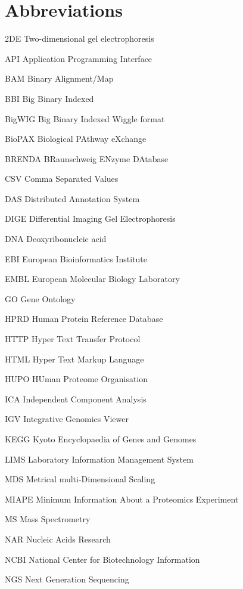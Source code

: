 \chapter*{Abbreviations}
\begin{abbreviations}
\setlength\itemsep{-0.5em}
	\item[2DE] Two-dimensional gel electrophoresis
	\item[API] Application Programming Interface
	\item[BAM] Binary Alignment/Map 
	\item[BBI] Big Binary Indexed
	\item[BigWIG] Big Binary Indexed Wiggle format
	\item[BioPAX] Biological PAthway eXchange
	\item[BRENDA] BRaunschweig ENzyme DAtabase
	\item[CSV]  Comma Separated Values 
	\item[DAS] Distributed Annotation System 
	\item[DIGE] Differential Imaging Gel Electrophoresis
	\item[DNA]Deoxyribonucleic acid
	\item[EBI] European Bioinformatics Institute
	\item[EMBL] European Molecular Biology Laboratory
	\item[GO] Gene Ontology
	\item[HPRD] Human Protein Reference Database
	\item[HTTP] Hyper Text Transfer Protocol
	\item[HTML] Hyper Text Markup Language
	\item[HUPO] HUman Proteome Organisation 
	\item[ICA] Independent Component Analysis   
	\item[IGV] Integrative Genomics Viewer
	\item[KEGG] Kyoto Encyclopaedia of Genes and Genomes
	\item[LIMS] Laboratory Information Management System
	\item[MDS] Metrical multi-Dimensional Scaling
	\item[MIAPE] Minimum Information About a Proteomics Experiment
	\item[MS] Mass Spectrometry
	\item[NAR] Nucleic Acids Research 
	\item[NCBI] National Center for Biotechnology Information
	\item[NGS] Next Generation Sequencing

\end{abbreviations}
